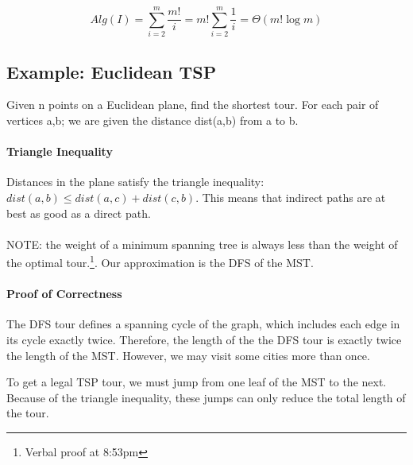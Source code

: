 \documentclass[a4paper]{article}
\begin{document}
\[Alg(I)=\sum\limits_{i=2}^m\frac{m!}{i}=m!\sum\limits_{i=2}^m \frac{1}{i}=\Theta(m! \log m)\]

\subsection{Example: Euclidean TSP}
Given n points on a Euclidean plane, find the shortest tour. For each pair of vertices a,b; we are given the distance dist(a,b) from a to b.

\paragraph{Triangle Inequality}
Distances in the plane satisfy the triangle inequality: $dist(a,b) \le dist(a,c) + dist(c,b)$. This means that indirect paths are at best as good as a direct path.

\paragraph{}
NOTE: the weight of a minimum spanning tree is always less than the weight of the optimal tour.\footnote{Verbal proof at 8:53pm}.
Our approximation is the DFS of the MST.

\paragraph{Proof of Correctness}
The DFS tour defines a spanning cycle of the graph, which includes each edge in its cycle exactly twice. Therefore, the length of the the DFS tour is exactly twice the length of the MST. However, we may visit some cities more than once.

To get a legal TSP tour, we must jump from one leaf of the MST to the next. Because of the triangle inequality, these jumps can only reduce the total length of the tour.


\end{document}
